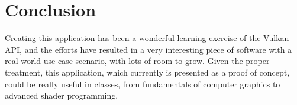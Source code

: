 \section{Conclusion}
Creating this application has been a wonderful learning exercise of the Vulkan API, and the efforts have resulted in a very interesting piece of software with a real-world use-case scenario, with lots of room to grow. Given the proper treatment, this application, which currently is presented as a proof of concept, could be really useful in classes, from fundamentals of computer graphics to advanced shader programming.
